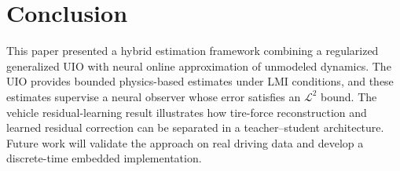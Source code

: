\documentclass{ifacconf}
\begin{document}
\vspace*{-0.2cm}
\section{Conclusion}\label{sec7}
\vspace*{-0.2cm}
%
This paper presented a hybrid estimation framework combining a regularized generalized UIO with neural online approximation of unmodeled dynamics. The UIO provides bounded physics-based estimates under LMI conditions, and these estimates supervise a neural observer whose error satisfies an $\mathcal L^2$ bound. The vehicle residual-learning result illustrates how tire-force reconstruction and learned residual correction can be separated in a teacher--student architecture. Future work will validate the approach on real driving data and develop a discrete-time embedded implementation.

\vspace*{-0.2cm}
% 
% 

\end{document}

